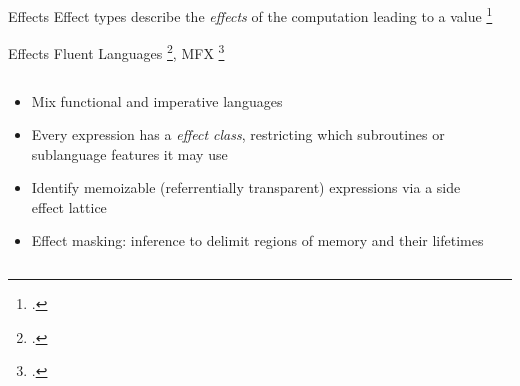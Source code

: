 \documentclass[aspectratio=169]{beamer}
\begin{document}

\begin{frame}{Effects}
    Effect types describe the \emph{effects} of the computation leading to a value \footcite{pierce_advanced_2005}
    \\
\end{frame}

\begin{frame}{Effects}
    Fluent Languages \footcite{gifford_integrating_1986}, MFX \footcite{lucassen_polymorphic_1988}
  \begin{columns}[T]
    \begin{column}{0.68\textwidth}
        \begin{itemize}[<+->]
            \item Mix functional and imperative languages 
            \item Every expression has a \emph{effect class}, restricting which subroutines or sublanguage features it may use
            \item Identify memoizable (referrentially transparent) expressions via a side effect lattice %
            \item Effect masking: inference to delimit regions of memory and their lifetimes
        \end{itemize}
    \end{column}

    \pause

    \begin{column}{0.30\textwidth}
    \vspace{-0.2in}
    \footnotesize{

}
\end{column}
\end{columns}
\end{frame}
\end{document}
